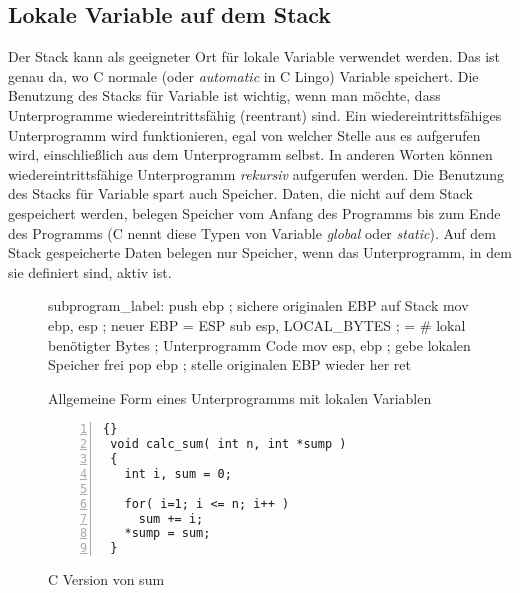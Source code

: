 \subsection{Lokale Variable auf dem Stack}

Der Stack kann als geeigneter Ort f\"{u}r lokale Variable verwendet
werden. Das ist genau da, wo C normale (oder \emph{automatic} in C
Lingo) Variable speichert. Die Benutzung des Stacks f\"{u}r Variable ist
wichtig, wenn man m\"{o}chte, dass Unterprogramme wiedereintrittsf\"{a}hig
(reentrant) sind. Ein wiedereintrittsf\"{a}higes Unterprogramm wird
funktionieren, egal von welcher Stelle aus es aufgerufen wird,
einschlie{\ss}lich aus dem Unterprogramm selbst. In anderen Worten
k\"{o}nnen wiedereintrittsf\"{a}hige Unterprogramm \emph{rekursiv}
aufgerufen werden. Die Benutzung des Stacks f\"{u}r Variable spart auch
Speicher. Daten, die nicht auf dem Stack gespeichert werden, belegen
Speicher vom Anfang des Programms bis zum Ende des Programms (C
nennt diese Typen von Variable \emph{global} oder \emph{static}).
Auf dem Stack gespeicherte Daten belegen nur Speicher, wenn das
Unterprogramm, in dem sie definiert sind, aktiv ist.

\begin{figure}[ht]
\begin{AsmCodeListing}[frame=single, numbers=left, commandchars=\\\{\}]
 subprogram_label:
      push   ebp              ; sichere originalen EBP auf Stack
      mov    ebp, esp         ; neuer EBP = ESP
      sub    esp, LOCAL_BYTES ; = # lokal ben\"{o}tigter Bytes
 ; Unterprogramm Code
      mov    esp, ebp         ; gebe lokalen Speicher frei
      pop    ebp              ; stelle originalen EBP wieder her
      ret
\end{AsmCodeListing}
\caption{Allgemeine Form eines Unterprogramms mit lokalen Variablen
\label{fig:subskel2}}
\end{figure}

\begin{figure}[ht]
\begin{lstlisting}[frame=tlrb, numbers=left]{}
 void calc_sum( int n, int *sump )
 {
   int i, sum = 0;

   for( i=1; i <= n; i++ )
     sum += i;
   *sump = sum;
 }
\end{lstlisting}
\caption{C Version von sum \label{fig:Csum}}
\end{figure}

